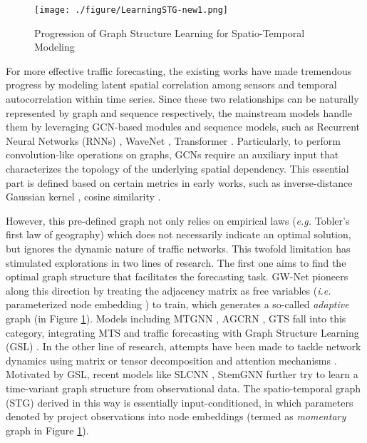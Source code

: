 \documentclass[letterpaper]{article} \usepackage{aaai23}  \usepackage{times}  \usepackage{helvet}  \usepackage{courier}  \usepackage[hyphens]{url}  \usepackage{graphicx} \urlstyle{rm} \def\UrlFont{\rm}  \usepackage{natbib}  \usepackage{caption} \usepackage{multirow}
\begin{document}
\begin{figure}[t]
	\centering
	\texttt{[image: ./figure/LearningSTG-new1.png]}
	\caption{Progression of Graph Structure Learning for Spatio-Temporal Modeling}
	\vspace{-12pt}
	\label{fig:intro}
\end{figure}

For more effective traffic forecasting, the existing works have made tremendous progress by modeling latent spatial correlation among sensors and temporal autocorrelation within time series. Since these two relationships can be naturally represented by graph and sequence respectively, the mainstream models handle them by leveraging GCN-based modules \cite{diao2019dynamic, guo2019attention, geng2019spatiotemporal, zhang2021traffic} and sequence models, such as Recurrent Neural Networks (RNNs) \cite{li2018diffusion, bai2020adaptive, ye2021coupled}, WaveNet \cite{wu2019graph}, Transformer \cite{zheng2020gman, wang2020traffic, xu2020spatial}. Particularly, to perform convolution-like operations on graphs, GCNs require an auxiliary input that characterizes the topology of the underlying spatial dependency. This essential part is defined based on certain metrics in early works, such as inverse-distance Gaussian kernel \cite{yu2018spatio, li2018diffusion}, cosine similarity \cite{geng2019spatiotemporal}. 

However, this pre-defined graph not only relies on empirical laws (\textit{e.g.} Tobler's first law of geography) which does not necessarily indicate an optimal solution, but ignores the dynamic nature of traffic networks. This twofold limitation has stimulated explorations in two lines of research. The first one aims to find the optimal graph structure that facilitates the forecasting task. GW-Net \cite{wu2019graph} pioneers along this direction by treating the adjacency matrix as free variables (\textit{i.e.} parameterized node embedding ) to train, which generates a so-called \textit{adaptive} graph (in Figure \ref{fig:intro}). Models including MTGNN \cite{wu2020connecting}, AGCRN \cite{bai2020adaptive}, GTS \cite{shang2021discrete} fall into this category, integrating MTS and traffic forecasting with Graph Structure Learning (GSL) \cite{zhu2021deep}. In the other line of research, attempts have been made to tackle network dynamics using matrix or tensor decomposition \cite{diao2019dynamic, ye2021coupled} and attention mechanisms \cite{guo2019attention, zheng2020gman}. Motivated by GSL, recent models like SLCNN \cite{zhang2020spatio}, StemGNN \cite{cao2020spectral} further try to learn a time-variant graph structure from observational data. The spatio-temporal graph (STG) derived in this way is essentially input-conditioned, in which parameters denoted by  project observations into node embeddings (termed as \textit{momentary} graph in Figure \ref{fig:intro}).
\end{document}
